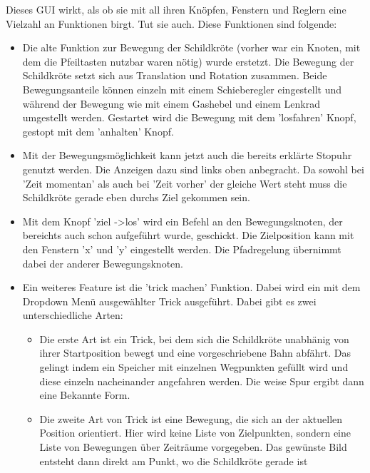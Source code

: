 \documentclass[11pt]{scrartcl}
\begin{document}
\begin{onehalfspace}
Dieses GUI wirkt, als ob sie mit all ihren Knöpfen, Fenstern und Reglern eine Vielzahl an Funktionen birgt. Tut sie auch. 
Diese Funktionen sind folgende:

\begin{itemize}
\item Die alte Funktion zur Bewegung der Schildkröte (vorher war ein Knoten, mit dem die Pfeiltasten nutzbar waren nötig) wurde erstetzt. Die Bewegung der Schildkröte setzt sich aus Translation und Rotation zusammen. Beide Bewegungsanteile können einzeln mit einem Schieberegler eingestellt und während der Bewegung wie mit einem Gashebel und einem Lenkrad umgestellt werden. Gestartet wird die Bewegung mit dem 'losfahren' Knopf, gestopt mit dem 'anhalten' Knopf.
\item Mit der Bewegungsmöglichkeit kann jetzt auch die bereits erklärte Stopuhr genutzt werden. Die Anzeigen dazu sind links oben anbegracht. Da sowohl bei 'Zeit momentan' als auch bei 'Zeit vorher' der gleiche Wert steht muss die Schildkröte gerade eben durchs Ziel gekommen sein. 
\item Mit dem Knopf 'ziel ->los' wird ein Befehl an den Bewegungsknoten, der  bereichts auch schon aufgeführt wurde, geschickt. Die Zielposition kann mit den Fenstern 'x' und 'y' eingestellt werden. Die Pfadregelung übernimmt dabei der anderer Bewegungsknoten.
\item Ein weiteres Feature ist die 'trick machen' Funktion. Dabei wird ein mit dem Dropdown Menü ausgewählter Trick ausgeführt. Dabei gibt es zwei unterschiedliche Arten:
\begin{itemize}
\item Die erste Art ist ein Trick, bei dem sich die Schildkröte unabhänig von ihrer Startposition bewegt und eine vorgeschriebene Bahn abfährt. Das gelingt indem ein Speicher mit einzelnen Wegpunkten gefüllt wird und diese einzeln nacheinander angefahren werden. Die weise Spur ergibt dann eine Bekannte Form.
\item Die zweite Art von Trick ist eine Bewegung, die sich an der aktuellen Position orientiert. Hier wird keine Liste von Zielpunkten, sondern eine Liste von Bewegungen über Zeiträume vorgegeben. Das gewünste Bild entsteht dann direkt am Punkt, wo die Schildkröte gerade ist


\end{itemize}
\end{itemize}
\end{onehalfspace}
\end{document}
